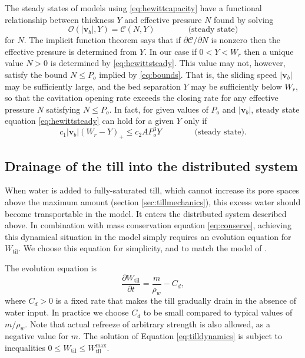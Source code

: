 \documentclass[gmd]{copernicus}   %
\newcommand{\text}{\textrm}
\newcommand\bv{\mathbf{v}}
\newcommand{\Wtil}{W_{\text{til}}}
\newcommand{\Wtilmax}{W_{\text{til}}^{\text{max}}}
\begin{document}
The steady states of models using \eqref{eq:hewittcapacity} have a functional relationship between thickness $Y$ and effective pressure $N$ found by solving
\begin{equation}
\mathcal{O}(|\bv_b|,Y) = \mathcal{C}(N,Y) \qquad \qquad \text{(steady state)} \label{eq:hewittsteady}
\end{equation}
for $N$.  The implicit function theorem says that if $\partial\mathcal{C}/\partial N$ is nonzero then the effective pressure is determined from $Y$.  In our case if $0<Y<W_r$ then a unique value $N>0$ is determined by \eqref{eq:hewittsteady}.  This value may not, however, satisfy the bound $N \le P_o$ implied by \eqref{eq:bounds}.  That is, the sliding speed $|\bv_b|$ may be sufficiently large, and the bed separation $Y$ may be sufficiently below $W_r$, so that the cavitation opening rate exceeds the closing rate for any effective pressure $N$ satisfying $N\le P_o$.  In fact, for given values of $P_o$ and $|\bv_b|$, steady state equation \eqref{eq:hewittsteady} can hold for a given $Y$ only if
\begin{equation}
c_1 |\bv_b| (W_r - Y)_+ \le c_2 A P_o^3 Y \qquad \qquad \text{(steady state)}. \label{eq:steadyOCbound}
\end{equation}


\subsection{Drainage of the till into the distributed system}  When water is added to fully-saturated till, which cannot increase its pore spaces above the maximum amount (section \ref{sec:tillmechanics}), this excess water should become transportable in the model.  It enters the distributed system described above.  In combination with mass conservation equation \eqref{eq:conserve}, achieving this dynamical situation in the model simply requires an evolution equation for $\Wtil$.  We choose this equation for simplicity, and to match the model of \cite{BBssasliding}.

The evolution equation is
\begin{equation}
\frac{\partial \Wtil}{\partial t} = \frac{m}{\rho_w} - C_d, \label{eq:tilldynamics}
\end{equation}
where $C_d>0$ is a fixed rate that makes the till gradually drain in the absence of water input.  In practice we choose $C_d$ to be small compared to typical values of $m/\rho_w$.  Note that actual refreeze of arbitrary strength is also allowed, as a negative value for $m$.  The solution of Equation \eqref{eq:tilldynamics} is subject to inequalities $0\le \Wtil \le \Wtilmax$.
\end{document}

